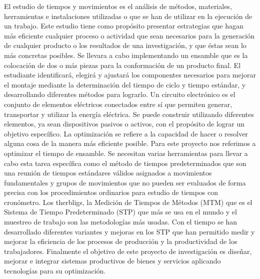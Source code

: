     El estudio de tiempos y movimientos es el análisis de métodos, materiales, herramientas e instalaciones utilizadas o que se han de utilizar en la ejecución de un trabajo. Este estudio tiene como propósito presentar estrategias que hagan más eficiente cualquier proceso o actividad que sean necesarios para la generación de cualquier producto o los resultados de una investigación, y que éstas sean lo más concretas posibles.\cite{Estudiodetiemposymovimientos}
    Se llevara a cabo implementando un ensamble que es la colocación de dos o más piezas para la conformación de un producto final. El estudiante identificará, elegirá y ajustará los componentes necesarios para mejorar el montaje mediante la determinación del tiempo de ciclo y tiempo estándar, y desarrollando diferentes métodos para lograrlo.\cite{Ensamble}
    Un circuito electrónico es el conjunto de elementos eléctricos conectados entre sí que permiten generar, transportar y utilizar la energía eléctrica. Se puede construir utilizando diferentes elementos, ya sean dispositivos pasivos o activos, con el propósito de lograr un objetivo específico.\cite{Circuitoelectrónico}
    La optimización se refiere a la capacidad de hacer o resolver alguna cosa de la manera más eficiente posible. Para este proyecto nos referimos a optimizar el tiempo de ensamble.\cite{Optimización} 
    Se necesitan varias herramientas para llevar a cabo esta tarea específica como el método de tiempos predeterminados que son una reunión de tiempos estándares válidos asignados a movimientos fundamentales y grupos de movimientos que no pueden ser evaluados de forma precisa con los procedimientos ordinarios para estudio de tiempos con cronómetro.\cite{Métododetiempospredeterminados}
    Los therbligs, la Medición de Tiempos de Métodos (MTM) que es el Sistema de Tiempo Predeterminado (STP) que más se usa en el mundo y el muestreo de trabajo son las metodologías más usadas. Con el tiempo se han desarrollado diferentes variantes y mejoras en los STP que han permitido medir y mejorar la eficiencia de los procesos de producción y la productividad de los trabajadores. Finalmente el objetivo de este proyecto de investigación es diseñar, mejorar e integrar sistemas productivos de bienes y servicios aplicando tecnologías para su optimización.
